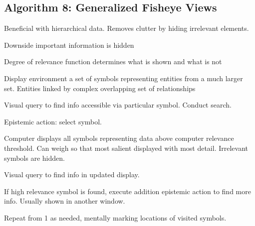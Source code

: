 \begin{mdframed}
\begin{multicols}{2}
\subsection{Algorithm 8: Generalized Fisheye Views}
\begin{compactdesc}
\item[Beneficial] with hierarchical data. Removes clutter by hiding
    irrelevant elements.
\item[Downside] important information is hidden
\item[Degree of relevance] function determines what is shown and what is not
\item[Display environment] a set of symbols representing entities from a
    much larger set. Entities linked by complex overlapping set of
    relationships
\end{compactdesc}

\midrule\begin{compactenum}
\item Visual query to find info accessible via particular symbol. Conduct
    search.
\item Epistemic action: select symbol.
\item Computer displays all symbols representing data above computer relevance
    threshold. Can weigh so that most salient displayed with most detail.
    Irrelevant symbols are hidden.
\item Visual query to find info in updated display.
\item If high relevance symbol is found, execute addition epistemic action
    to find more info. Usually shown in another window.
\item Repeat from 1 as needed, mentally marking locations of visited symbols.
\end{compactenum}

\end{multicols}\end{mdframed}





